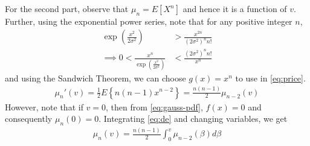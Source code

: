 \documentclass{beamer}
\begin{document}
\begin{frame}
	For the second part, observe that $\mu_n = E[X^n]$ and hence it is a function of $v$. Further, using the exponential power series, note that for any positive integer $n$,
	\begin{align}
		\exp{\left(\frac{x^2}{2\sigma^2}\right)} &> \frac{x^{2n}}{(2\sigma^2)^nn!} \\
		\implies 0 < \frac{x^n}{\exp{\left(\frac{x^2}{2\sigma^2}\right)}} &< \frac{(2\sigma^2)^nn!}{x^n}
		\label{eq:sandwich}
	\end{align}
	and using the Sandwich Theorem, we can choose $g(x) = x^n$ to use in \eqref{eq:price}.
	\begin{align}
		\mu_n'(v) = \frac{1}{2}E\left\{n(n - 1)x^{n - 2}\right\} = \frac{n(n - 1)}{2}\mu_{n - 2}{(v)}
		\label{eq:de}
	\end{align}
	However, note that if $v = 0$, then from \eqref{eq:gauss-pdf}, $f(x) = 0$ and consequently $\mu_n(0) = 0$. Integrating \eqref{eq:de} and changing variables, we get
	\begin{align}
		\mu_n(v) = \frac{n(n - 1)}{2}\int_{0}^{v}\mu_{n - 2}(\beta)d\beta
		\label{eq:sol2}
	\end{align}
\end{frame}
\end{document}
